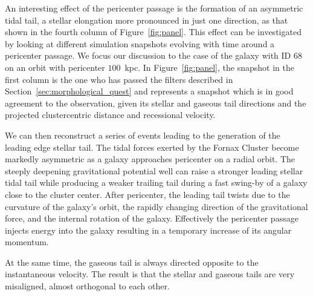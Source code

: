 An interesting effect of the pericenter passage is the formation of an asymmetric tidal tail, a stellar elongation more pronounced in just one direction, as that shown in the fourth column of Figure~\ref{fig:panel}.
This effect can be investigated by looking at different simulation snapshots evolving with time around a pericenter passage.
We focus our discussion to the case of the galaxy with ID 68 on an orbit with pericenter $100$~kpc.
In Figure~\ref{fig:panel}, the snapshot in the first column is the one who has passed the filters described in Section~\ref{sec:morphological_quest} and represents a snapshot which is in good agreement to the observation, given its stellar and gaseous tail directions and the projected clustercentric distance and recessional velocity.

We can then reconstruct a series of events leading to the generation of the leading edge stellar tail.
The tidal forces exerted by the Fornax Cluster become markedly asymmetric as a galaxy approaches pericenter on a radial orbit. The steeply deepening gravitational potential well can raise a stronger leading stellar tidal tail while producing a weaker trailing tail during a fast swing-by of a galaxy close to the cluster center. After pericenter, the leading tail twists due to the curvature of the galaxy's orbit, the rapidly changing direction of the gravitational force, and the internal rotation of the galaxy.
Effectively the pericenter passage injects energy into the galaxy resulting in a temporary increase of its angular momentum.

At the same time, the gaseous tail is always directed opposite to the instantaneous velocity.
The result is that the stellar and gaseous tails are very misaligned, almost orthogonal to each other.


